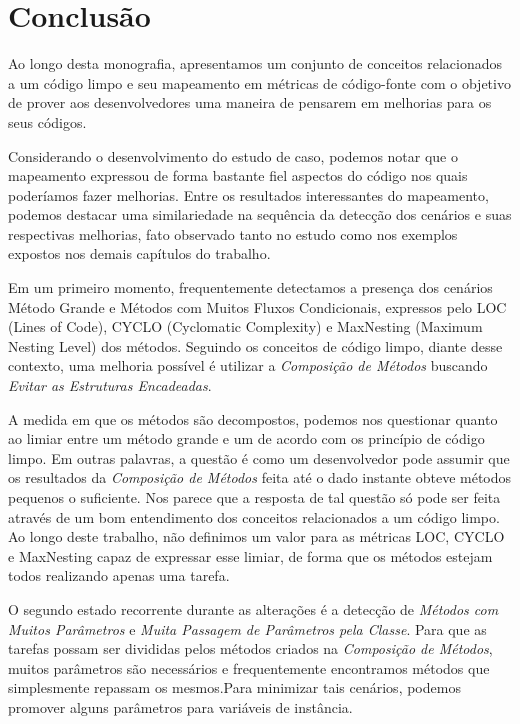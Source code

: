 \chapter{Conclusão}
\label{chap:conclusao}

Ao longo desta monografia, apresentamos um conjunto de conceitos relacionados a um código limpo e
seu mapeamento em métricas de código-fonte com o objetivo de prover aos desenvolvedores uma maneira
de pensarem em melhorias para os seus códigos.

Considerando o desenvolvimento do estudo de caso, podemos notar que o mapeamento expressou de forma
bastante fiel aspectos do código nos quais poderíamos fazer melhorias.  Entre os resultados interessantes
do mapeamento, podemos destacar uma similariedade na sequência da detecção dos cenários e suas respectivas
melhorias, fato observado tanto no estudo como nos exemplos expostos nos demais capítulos do trabalho.

Em um primeiro momento, frequentemente detectamos a presença dos cenários Método Grande e Métodos com Muitos 
Fluxos Condicionais, expressos pelo LOC (Lines of Code), CYCLO (Cyclomatic Complexity) e
MaxNesting (Maximum Nesting Level) dos métodos. Seguindo os conceitos de código limpo,
diante desse contexto, uma melhoria possível é utilizar a \textit{Composição de Métodos} buscando
\textit{Evitar as Estruturas Encadeadas}.

A medida em que os métodos são decompostos, podemos nos questionar quanto ao limiar entre um método grande e 
um de acordo com os princípio de código limpo.
Em outras palavras, a questão é como um desenvolvedor pode assumir que os resultados da
\textit{Composição de Métodos} feita até o dado instante obteve métodos pequenos o suficiente. Nos parece que a 
resposta de tal questão só pode ser feita através de um bom entendimento dos conceitos relacionados a um código 
limpo. Ao longo deste trabalho, não definimos um valor para as métricas LOC, CYCLO e MaxNesting capaz de expressar 
esse limiar, de forma que os métodos estejam todos realizando apenas uma tarefa.

O segundo estado recorrente durante as alterações é a detecção de \textit{Métodos com Muitos Parâmetros} e
\textit{Muita Passagem de Parâmetros pela Classe}. Para que as tarefas possam ser divididas pelos métodos 
criados na \textit{Composição de Métodos}, muitos parâmetros são necessários e frequentemente encontramos
métodos que simplesmente repassam os mesmos.Para minimizar tais cenários, podemos promover alguns parâmetros para 
variáveis de instância.

